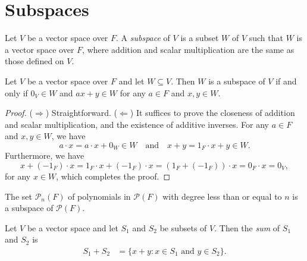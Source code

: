 \section{Subspaces}
\begin{definition}
  \label{def:subspace}
  Let $V$ be a vector space over $F$.
  A \emph{subspace} of $V$ is a subset $W$ of $V$ such that $W$ is a vector
  space over $F$, where addition and scalar multiplication are the same as
  those defined on $V$.
\end{definition}

\begin{theorem}
  \label{thm:subspace}
  Let $V$ be a vector space over $F$ and let $W \subseteq V$.
  Then $W$ is a subspace of $V$ if and only if $0_V \in W$ and $ax + y \in W$
  for any $a \in F$ and $x, y \in W$.
\end{theorem}
\begin{proof}
  ($\Rightarrow$)
  Straightforward.
  ($\Leftarrow$)
  It suffices to prove the closeness of addition and scalar multiplication,
  and the existence of additive inverses.
  For any $a \in F$ and $x, y \in W$, we have
  \begin{equation*}
    a \cdot x = a \cdot x + 0_W \in W
    \quad \text{and} \quad
    x + y = 1_F \cdot x + y \in W.
  \end{equation*}
  Furthermore, we have
  \begin{equation*}
    x + (-1_F) \cdot x
    = 1_F \cdot x + (-1_F) \cdot x
    = (1_F + (-1_F)) \cdot x
    = 0_F \cdot x
    = 0_V,
  \end{equation*}
  for any $x \in W$, which completes the proof.
\end{proof}

\begin{example}
  The set $\mathcal{P}_n(F)$ of polynomials in $\mathcal{P}(F)$ with
  degree less than or equal to $n$ is a subspace of $\mathcal{P}(F)$.
\end{example}

\begin{definition}
  Let $V$ be a vector space and let $S_1$ and $S_2$ be subsets of $V$.
  Then the \emph{sum} of $S_1$ and $S_2$ is
  \begin{align*}
    S_1 + S_2 &= \{x + y: \text{$x \in S_1$ and $y \in S_2$}\}.
  \end{align*}
\end{definition}

